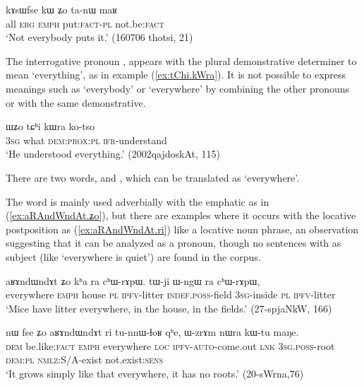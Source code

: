 \begin{exe}
\ex \label{ex:kAsWfse.kW}
\gll kɤsɯfse kɯ ʑo ta-nɯ maʁ \\
all \textsc{erg} \textsc{emph} put:\textsc{fact}-\textsc{pl} not.be:\textsc{fact} \\
\glt `Not everybody puts it.' (160706 thotsi, 21)
\end{exe}

The interrogative pronoun , appears with the plural demonstrative determiner  to mean `everything', as in example (\ref{ex:tChi.kWra}). It is not possible to express meanings such as `everybody' or `everywhere'  by combining the other pronouns  or  with the same demonstrative.

\begin{exe}
\ex \label{ex:tChi.kWra}
\gll ɯʑo tɕʰi kɯra ko-tso \\
\textsc{3sg} what \textsc{dem:prox:pl} \textsc{ifr}-understand \\
\glt `He understood everything.' (2002qajdoskAt, 115)
\end{exe}

There are two words,  and , which can be translated as `everywhere'.

The word  is mainly used adverbially with the emphatic  as in (\ref{ex:aRAndWndAt.ʑo}), but there are examples where it occurs with the locative postposition  as (\ref{ex:aRAndWndAt.ri}) like a locative noun phrase, an observation suggesting that it can be analyzed as a pronoun, though no sentences with  as subject (like `everywhere is quiet') are found in the corpus.

 \begin{exe}
\ex \label{ex:aRAndWndAt.ʑo}
\gll  aʁɤndɯndɤt ʑo kʰa ra cʰɯ-rɤpɯ. tɯ-ji ɯ-ngɯ ra cʰɯ-rɤpɯ, \\
everywhere \textsc{emph} house \textsc{pl} \textsc{ipfv}-litter \textsc{indef.poss}-field \textsc{3sg}-inside \textsc{pl} \textsc{ipfv}-litter \\
\glt `Mice have litter everywhere, in the house, in the fields.' (27-spjaNkW, 166)
\end{exe} 

 \begin{exe}
\ex \label{ex:aRAndWndAt.ri}
\gll nɯ fse ʑo aʁɤndɯndɤt ri tu-nnɯ-ɬoʁ qʰe, ɯ-zrɤm nɯra kɯ-tu maŋe. \\
\textsc{dem} be.like:\textsc{fact} \textsc{emph} everywhere \textsc{loc} \textsc{ipfv}-\textsc{auto}-come.out \textsc{lnk} \textsc{3sg.poss}-root \textsc{dem:pl} \textsc{nmlz}:S/A-exist not.exist:\textsc{sens} \\
\glt `It grows simply like that everywhere, it has no roots.' (20-sWrna,76)
\end{exe} 

